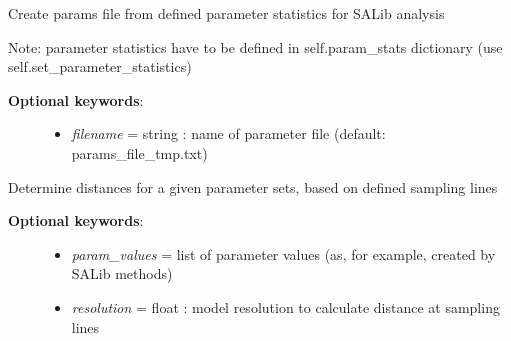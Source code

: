 \documentclass[a4paper,10pt,english]{sphinxmanual}
\begin{document}
\begin{fulllineitems}
\begin{fulllineitems}
\begin{description}
\begin{itemize}
\end{itemize}

\end{description}

\end{fulllineitems}


\begin{fulllineitems}
\label{pynoddy:pynoddy.experiment.SensitivityAnalysis.SensitivityAnalysis.create_params_file}
Create params file from defined parameter statistics for SALib analysis

Note: parameter statistics have to be defined in self.param\_stats dictionary
(use self.set\_parameter\_statistics)
\begin{description}
\item[{\textbf{Optional keywords}:}] \leavevmode\begin{itemize}
\item {} 
\emph{filename} = string : name of parameter file (default: params\_file\_tmp.txt)

\end{itemize}

\end{description}

\end{fulllineitems}


\begin{fulllineitems}
\label{pynoddy:pynoddy.experiment.SensitivityAnalysis.SensitivityAnalysis.determine_distances}
Determine distances for a given parameter sets, based on defined sampling lines
\begin{description}
\item[{\textbf{Optional keywords}:}] \leavevmode\begin{itemize}
\item {} 
\emph{param\_values} = list of parameter values (as, for example, created by SALib methods)

\item {} 
\emph{resolution} = float : model resolution to calculate distance at sampling lines


\end{itemize}
\end{description}
\end{fulllineitems}
\end{fulllineitems}
\end{document}
